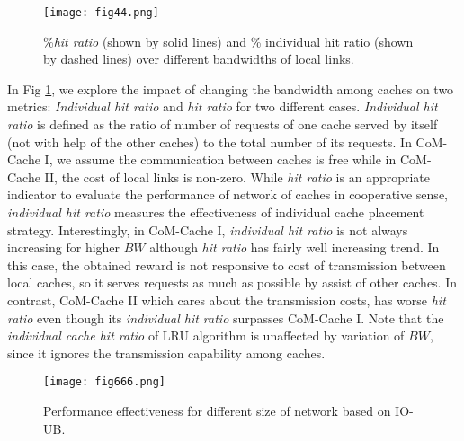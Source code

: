 \documentclass[journal,onecolumn]{IEEEtran}
\begin{document}
\begin{figure}[h]
\centering
\texttt{[image: fig44.png]}
\caption{ \%\textit{hit ratio} (shown by solid lines) and \% individual hit ratio (shown by dashed lines) over different bandwidths of local links.}\label{cache:fig4}
\end{figure}


In Fig \ref{cache:fig4}, we explore the impact of changing the bandwidth among caches on two metrics: \textit {Individual hit ratio} and \textit{hit ratio} for two different cases. \textit{Individual  hit ratio} is defined as the ratio of number of requests of one cache served by itself (not with help of the other caches) to the total number of its requests. In CoM-Cache I, we assume the communication between caches is free while in CoM-Cache II, the cost of local links is non-zero. While \textit{hit ratio} is an appropriate indicator to evaluate the performance of network of caches in cooperative sense, \textit{individual hit ratio} measures the effectiveness of individual cache placement strategy. Interestingly, in CoM-Cache I, \textit{individual hit ratio} is not always increasing for higher $BW$ although \textit{hit ratio} has fairly well increasing trend. In this case, the obtained reward is not responsive to cost of transmission between local caches, so it serves requests as much as possible by assist of other caches. In contrast, CoM-Cache II which cares about the transmission costs, has worse \textit{hit ratio} even though its \textit{individual hit ratio} surpasses CoM-Cache I. Note that the \textit{individual cache hit ratio} of LRU algorithm is unaffected by variation of $BW$, since it ignores the transmission capability among caches.




\begin{figure}[h]
\centering
\texttt{[image: fig666.png]}
\caption{Performance effectiveness for different size of network based on IO-UB.}\label{effec}
\end{figure}
\end{document}
